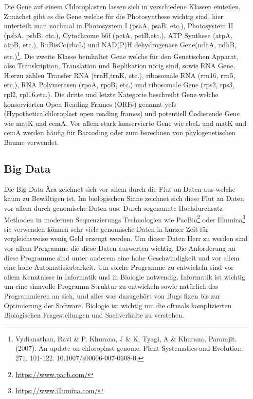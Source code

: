 \documentclass{scrartcl}
\begin{document}
Die Gene auf einem Chloroplasten lassen sich in verschiedene Klassen einteilen. Zunächst gibt es die Gene welche für die Photosynthese wichtig sind,
hier unterteilt man nochmal in Photosystem I (psaA, psaB, etc.), Photosystem II (psbA, psbB, etc.), Cytochrome b6f (petA, petB,etc.), 
ATP Synthese (atpA, atpB, etc.), RuBisCo(rbcL) und NAD(P)H dehydrogenase Gene(ndhA, ndhB, etc.)\footnote{Vydianathan, Ravi \& P. Khurana, J \& K. Tyagi, A \& Khurana, Paramjit. (2007). An update on chloroplast genome. Plant Systematics and Evolution. 271. 101-122. 10.1007/s00606-007-0608-0.}. Die zweite Klasse beinhaltet Gene welche für den
Genetischen Apparat, also Transkription, Translation und Replikation nötig sind, sowie RNA Gene. Hierzu zählen Transfer RNA (trnH,trnK, etc.), ribosomale RNA (rrn16, rrn5, etc.), 
RNA Polymerasen (rpoA, rpoB, etc.) und ribosomale Gene (rps2, rps3, rpl2, rpl16,etc.). Die dritte und letzte Kategorie beschreibt Gene welche konservierten Open Reading Frames (ORFs)
genannt ycfs (Hypotheticalchloroplast open reading frames) und potentiell Codierende Gene wie matK und cemA\footnotemark[6]{}. Vor allem stark konservierte Gene wie rbcL und matK und cemA werden 
häufig für Barcoding oder zum berechnen von phylogenetischen Bäume verwendet.
\subsection{Big Data}
\label{sec-2-2}
Die Big Data Ära zeichnet sich vor allem durch die Flut an Daten aus welche kaum zu Bewältigen ist. Im biologischen Sinne zeichnet sich diese 
Flut an Daten vor allem durch genomische Daten aus. Durch sogenannte Hochdurchsatz Methoden in modernen Sequenzierungs Technologien wie PacBio\footnote{\url{https://www.pacb.com/}} oder Illumina\footnote{\url{https://www.illumina.com/}}
sie verwenden können sehr viele genomische Daten in kurzer Zeit für vergleichsweise wenig Geld erzeugt werden. Um dieser Daten Herr zu werden sind vor allem
Programme die diese Daten auswerten wichtig. Die Anforderung an diese Programme sind unter anderem eine hohe Geschwindigkeit und vor allem eine hohe 
Automatisierbarkeit. Um solche Programme zu entwickeln sind vor allem Kenntnisse in Informatik und in Biologie notwendig. Informatik ist wichtig um eine sinnvolle Programm Struktur 
zu entwickeln sowie natürlich das Programmieren an sich, und alles was dazugehört von Bugs fixen bis zur Optimierung der Software. Biologie ist wichtig um die oftmals komplizierten
Biologischen Fragestellungen und Sachverhalte zu verstehen.  
\end{document}
